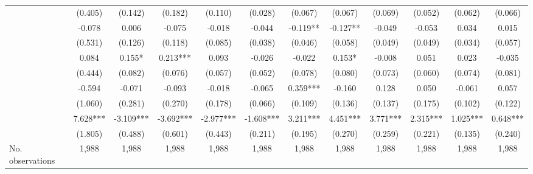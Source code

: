 \begin{table}
\begin{threeparttable}
\begin{tabular}{p{3cm}S@{}S@{}S@{}S@{}S@{}S@{}S@{}S@{}S@{}S@{}S@{}}
                                          &     (0.405)   &     (0.142)   &     (0.182)   &     (0.110)   &     (0.028)   &     (0.067)   &     (0.067)   &     (0.069)   &     (0.052)   &     (0.062)   &     (0.066)   \\
                        &      -0.078   &       0.006   &      -0.075   &      -0.018   &      -0.044   &      -0.119** &      -0.127** &      -0.049   &      -0.053   &       0.034   &       0.015   \\
                                          &     (0.531)   &     (0.126)   &     (0.118)   &     (0.085)   &     (0.038)   &     (0.046)   &     (0.058)   &     (0.049)   &     (0.049)   &     (0.034)   &     (0.057)   \\
                     &       0.084   &       0.155*  &       0.213***&       0.093   &      -0.026   &      -0.022   &       0.153*  &      -0.008   &       0.051   &       0.023   &      -0.035   \\
                                          &     (0.444)   &     (0.082)   &     (0.076)   &     (0.057)   &     (0.052)   &     (0.078)   &     (0.080)   &     (0.073)   &     (0.060)   &     (0.074)   &     (0.081)   \\
                         &      -0.594   &      -0.071   &      -0.093   &      -0.018   &      -0.065   &       0.359***&      -0.160   &       0.128   &       0.050   &      -0.061   &       0.057   \\
                                          &     (1.060)   &     (0.281)   &     (0.270)   &     (0.178)   &     (0.066)   &     (0.109)   &     (0.136)   &     (0.137)   &     (0.175)   &     (0.102)   &     (0.122)   \\
                      &       7.628***&      -3.109***&      -3.692***&      -2.977***&      -1.608***&       3.211***&       4.451***&       3.771***&       2.315***&       1.025***&       0.648***\\
                                          &     (1.805)   &     (0.488)   &     (0.601)   &     (0.443)   &     (0.211)   &     (0.195)   &     (0.270)   &     (0.259)   &     (0.221)   &     (0.135)   &     (0.240)   \\
            \midrule
            No. observations              &       1,988   &       1,988   &       1,988   &       1,988   &       1,988   &       1,988   &       1,988   &       1,988   &       1,988   &       1,988   &       1,988   \\

\end{tabular}
\end{threeparttable}
\end{table}

